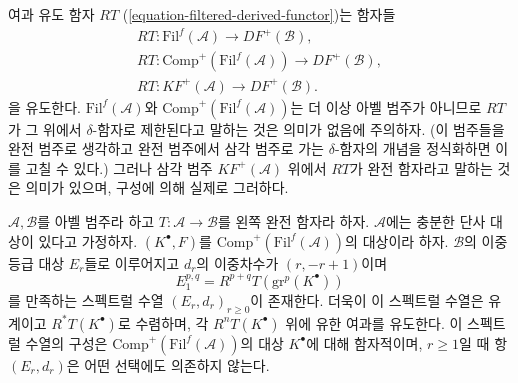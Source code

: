 \medskip\noindent
여과 유도 함자 $RT$ (\ref{equation-filtered-derived-functor})는 함자들
$$
\begin{matrix}
RT : \text{Fil}^f(\mathcal{A}) \to DF^{+}(\mathcal{B}), \\
RT : \text{Comp}^{+}(\text{Fil}^f(\mathcal{A})) \to DF^{+}(\mathcal{B}), \\
RT : KF^{+}(\mathcal{A}) \to DF^{+}(\mathcal{B}).
\end{matrix}
$$
을 유도한다. $\text{Fil}^f(\mathcal{A})$와
$\text{Comp}^{+}(\text{Fil}^f(\mathcal{A}))$는 더 이상 아벨 범주가
아니므로 $RT$가 그 위에서 $\delta$-함자로 제한된다고 말하는 것은
의미가 없음에 주의하자. (이 범주들을 완전 범주로 생각하고 완전
범주에서 삼각 범주로 가는 $\delta$-함자의 개념을 정식화하면 이를
고칠 수 있다.) 그러나 삼각 범주 $KF^{+}(\mathcal{A})$ 위에서 $RT$가
완전 함자라고 말하는 것은 의미가 있으며, 구성에 의해 실제로
그러하다.

\begin{lemma}
\label{lemma-ss-filtered-derived}
$\mathcal{A}, \mathcal{B}$를 아벨 범주라 하고
$T : \mathcal{A} \to \mathcal{B}$를 왼쪽 완전 함자라 하자.
$\mathcal{A}$에는 충분한 단사 대상이 있다고 가정하자.
$(K^\bullet, F)$를 $\text{Comp}^{+}(\text{Fil}^f(\mathcal{A}))$의
대상이라 하자. $\mathcal{B}$의 이중등급 대상 $E_r$들로 이루어지고
$d_r$의 이중차수가 $(r, - r + 1)$이며
$$
E_1^{p, q} = R^{p + q}T(\text{gr}^p(K^\bullet))
$$
를 만족하는 스펙트럴 수열 $(E_r, d_r)_{r\geq 0}$이 존재한다.
더욱이 이 스펙트럴 수열은 유계이고 $R^*T(K^\bullet)$로 수렴하며,
각 $R^nT(K^\bullet)$ 위에 유한 여과를 유도한다. 이 스펙트럴 수열의
구성은 $\text{Comp}^{+}(\text{Fil}^f(\mathcal{A}))$의 대상
$K^\bullet$에 대해 함자적이며, $r \geq 1$일 때 항
$(E_r, d_r)$은 어떤 선택에도 의존하지 않는다.
\end{lemma}

